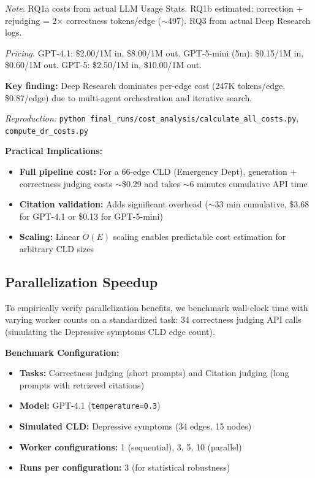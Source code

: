 \documentclass{article}
\begin{document}
\begin{table}[H]
\begin{tablenotes}
\small
\item \textit{Note.} RQ1a costs from actual LLM Usage Stats. RQ1b estimated: correction + rejudging = 2$\times$ correctness tokens/edge ($\sim$497). RQ3 from actual Deep Research logs.
\item \textit{Pricing.} GPT-4.1: \$2.00/1M in, \$8.00/1M out. GPT-5-mini (5m): \$0.15/1M in, \$0.60/1M out. GPT-5: \$2.50/1M in, \$10.00/1M out.
\item \textbf{Key finding:} Deep Research dominates per-edge cost (247K tokens/edge, \$0.87/edge) due to multi-agent orchestration and iterative search.
\item \textit{Reproduction:} \texttt{python final\_runs/cost\_analysis/calculate\_all\_costs.py}, \texttt{compute\_dr\_costs.py}
\end{tablenotes}
\end{table}

\textbf{Practical Implications:}
\begin{itemize}[noitemsep]
    \item \textbf{Full pipeline cost:} For a 66-edge CLD (Emergency Dept), generation + correctness judging costs $\sim$\$0.29 and takes $\sim$6 minutes cumulative API time
    \item \textbf{Citation validation:} Adds significant overhead ($\sim$33 min cumulative, \$3.68 for GPT-4.1 or \$0.13 for GPT-5-mini)
    \item \textbf{Scaling:} Linear $O(E)$ scaling enables predictable cost estimation for arbitrary CLD sizes
\end{itemize}

\subsection{Parallelization Speedup}

To empirically verify parallelization benefits, we benchmark wall-clock time with varying worker counts on a standardized task: 34 correctness judging API calls (simulating the Depressive symptoms CLD edge count).

\textbf{Benchmark Configuration:}
\begin{itemize}[noitemsep]
    \item \textbf{Tasks:} Correctness judging (short prompts) and Citation judging (long prompts with retrieved citations)
    \item \textbf{Model:} GPT-4.1 (\texttt{temperature=0.3})
    \item \textbf{Simulated CLD:} Depressive symptoms (34 edges, 15 nodes)
    \item \textbf{Worker configurations:} 1 (sequential), 3, 5, 10 (parallel)
    \item \textbf{Runs per configuration:} 3 (for statistical robustness)
\end{itemize}
\end{document}
